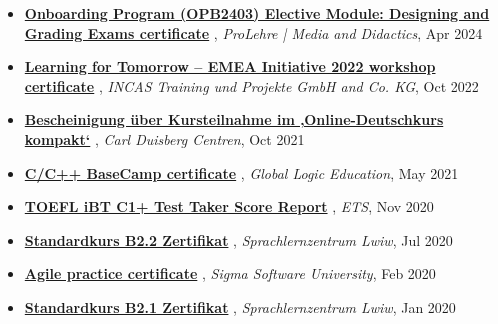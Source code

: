 \documentclass[letterpaper,10pt]{article}
\newcommand{\titleItem}[1]{
  \textbf{#1}
}
\begin{document}
\begin{itemize}[leftmargin=0.15in, label={}]
    \item
			\titleItem{\href{https://drive.google.com/file/d/1Y9H57_RHNfcvenPWm-lEijENrPJ8DOl7/view?usp=sharing}{{Onboarding Program (OPB2403) Elective Module: Designing and Grading Exams certificate}}}, \emph{ProLehre | Media and Didactics}, Apr 2024
			\vspace{-9pt}
		
    \item
			\titleItem{\href{https://drive.google.com/file/d/1qXNUGVgYOu4-4CxzNn5vbrJAnwtN9y5I/view?usp=sharing}{{Learning for Tomorrow – EMEA Initiative 2022 workshop certificate}}}, \emph{INCAS Training und Projekte GmbH and Co. KG}, Oct 2022
			\vspace{-9pt}
		
    \item
			\titleItem{\href{https://drive.google.com/file/d/1FmNG8IXbU_ddM7iJubDrBrLH5RIntkai/view?usp=sharing}{{Bescheinigung über Kursteilnahme im ‚Online-Deutschkurs kompakt‘}}}, \emph{Carl Duisberg Centren}, Oct 2021
			\vspace{-9pt}
		
    \item
			\titleItem{\href{https://drive.google.com/file/d/1QX0Q6L-sdbtzkLzREmdmrmrlCb_pL2H9/view?usp=sharing}{{C/C++ BaseCamp certificate}}}, \emph{Global Logic Education}, May 2021
			\vspace{-9pt}
		
    \item
			\titleItem{\href{https://drive.google.com/file/d/1XL6SUxIYBzqoSwck5ZSPzK3rQbgAqewI/view?usp=sharing}{{TOEFL iBT C1+ Test Taker Score Report}}}, \emph{ETS}, Nov 2020
			\vspace{-9pt}
		
    \item
			\titleItem{\href{https://drive.google.com/file/d/1RlLSvM_3e2ge_CuGSYeGQfTOlzlmEYdH/view?usp=sharing}{{Standardkurs B2.2 Zertifikat}}}, \emph{Sprachlernzentrum Lwiw}, Jul 2020
			\vspace{-9pt}
		
    \item
			\titleItem{\href{https://drive.google.com/file/d/1LTYpV6Q1HNzGcMxh6HO4tlEtwELc0Pta/view?usp=sharing}{{Agile practice certificate}}}, \emph{Sigma Software University}, Feb 2020
			\vspace{-9pt}
		
    \item
			\titleItem{\href{https://drive.google.com/open?id=17kmCOkC1snH8HCPZ8kAo2MOrqXi1my6P}{{Standardkurs B2.1 Zertifikat}}}, \emph{Sprachlernzentrum Lwiw}, Jan 2020
			\vspace{-9pt}
		

\end{itemize}
\end{document}
